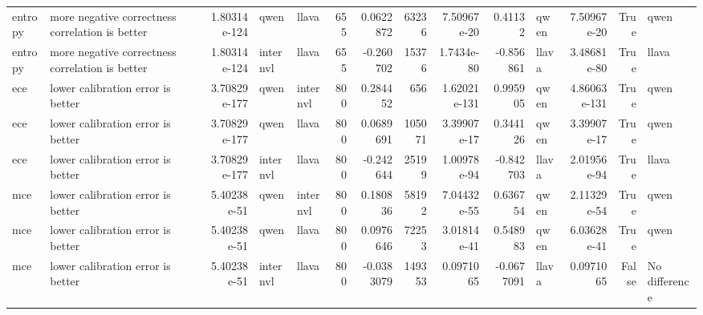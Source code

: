 \begin{table}[tbp]
\begin{tabular}{llrllrrrrrlrrl}
entropy & more negative correctness correlation is better & 1.80314e-124 & qwen & llava & 655 & 0.0622872 & 63236 & 7.50967e-20 & 0.41132 & qwen & 7.50967e-20 & True & qwen \\
entropy & more negative correctness correlation is better & 1.80314e-124 & internvl & llava & 655 & -0.260702 & 15376 & 1.7434e-80 & -0.856861 & llava & 3.48681e-80 & True & llava \\
ece & lower calibration error is better & 3.70829e-177 & qwen & internvl & 800 & 0.284452 & 656 & 1.62021e-131 & 0.995905 & qwen & 4.86063e-131 & True & qwen \\
ece & lower calibration error is better & 3.70829e-177 & qwen & llava & 800 & 0.0689691 & 105071 & 3.39907e-17 & 0.344126 & qwen & 3.39907e-17 & True & qwen \\
ece & lower calibration error is better & 3.70829e-177 & internvl & llava & 800 & -0.242644 & 25199 & 1.00978e-94 & -0.842703 & llava & 2.01956e-94 & True & llava \\
mce & lower calibration error is better & 5.40238e-51 & qwen & internvl & 800 & 0.180836 & 58192 & 7.04432e-55 & 0.636754 & qwen & 2.11329e-54 & True & qwen \\
mce & lower calibration error is better & 5.40238e-51 & qwen & llava & 800 & 0.0976646 & 72253 & 3.01814e-41 & 0.548983 & qwen & 6.03628e-41 & True & qwen \\
mce & lower calibration error is better & 5.40238e-51 & internvl & llava & 800 & -0.0383079 & 149353 & 0.0971065 & -0.0677091 & llava & 0.0971065 & False & No difference \\
\bottomrule
\end{tabular}
\end{table}
